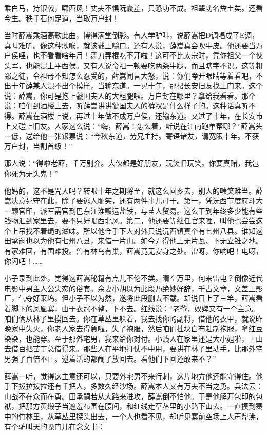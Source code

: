 乘白马，持银戟，啸西风！丈夫不惧阮囊羞，只恐功不成。祖辈功名粪土矣。还看今生。秩千石何足道，当取万户封！ 

当时薛嵩乘酒高歌此曲，博得满堂倒彩。有人学驴叫，说薛嵩把D调唱成了E调，真叫难听。像这种歌喉，就该戴上嚼口。还有人说，薛嵩真会吹牛皮。他还要当万户侯哩，也不看看啥年月！舞刀弄棍吃不开啦！这可不比太宗时，凭你祖父一个伙头军，也能混上平西侯。又有人说令祖一顿要吃两条牛腿，而且瞎字不识。这等粗鄙之徒，令祖母不知怎么忍受的，薛嵩闻言大怒，说：你们睁开眼睛等着看吧，不出十年薛某人混不出个模样，当输东道。一晃十年，那帮长安旧友找上门来。这个说：薛嵩，你可是抱上虢国夫人的大粗腿啦。万户封在哪里？拿给我看看。那个说：咱们到酒楼上去，听薛嵩讲讲虢国夫人的裤衩是什么样子的。这种话真听不得。薛嵩在酒楼上说，再过十年做不成万户侯，还输东道。又过了十年，在长安市上又碰上旧友。人家这么说：“嗨，薛嵩！怎么着，听说在江南跑单帮哪？”薛嵩头一低，送给他一张银票说：“今秋东道，劳兄主持。寄语诸友，请宽限十年。不获万户封，当割首级！” 

那人说：“得啦老薛，千万别介。大伙都是好朋友，玩笑旧玩笑。你要真赌，我包你死为无头鬼！” 

他妈的，这不是咒人吗？转眼十年之期将至，就这么回乡去，别人的嗤笑难当。薛嵩决意死守在此，除了要逃人耻笑，还有两件事儿可干。第一，凭沅西节度府斗大一颗官印，派军需官到巴东江淮贩运盐铁，与苗人贸易。这么干到年终多少能有些钱物汇到家里去，要不只好喝西北风。第二，他还要等继任官来哩，叫他也尝尝这个上吊找不着绳的滋味。所以他今手下人对外只说沅西镇真个有七州八县。谁知这田承嗣也以为他有七州八县，来借一片山。如今弄得他上无片瓦、下无立锥之地。有家难回，有国难投。兽有林乌有巢，薛嵩竟无安身之处。雷呀，你响吧！电呀，你闪吧！…… 

小子录到此处，觉得这薛嵩秘籍有点儿不伦不类。晴空万里，何来雷电？倒像近代电影中男主人公失恋的俗套。余妻小胡以为此段乃绝妙好辞，千古文章，文盖上影厂，气夺好莱坞。但小子不以为然，遂将此段删去不载。却说日上了三竿，薛嵩看着脚下的凤凰寨，由于衣冠不整，下不去。红线说：“老爷，奴婢又有一个主意。咱们俩从林子里摸回去。你在草丛里躲着，我去找你的副将，借他的衣甲，就说昨晚家中失火，你老人家去得急啦，失了袍服，然后咱们扯块白布赶制袍服，拿红豆染染，也能穿。至于那外宅男，我来给你对付。小贱人在家里还是大小姐啦，上山去借百把苗丁总借得来。那些人在平地打仗不中用，要讲在林子里动手，比那外宅男强了百倍不止。逮着活的都阉了放回去。看他们下回还敢来不？” 

薛嵩一听，觉得这主意还可以，只要外宅男不来行刺，这片地方他还能守得住。他手下拨拉拨拉还有千把人，多数久经沙场。薛嵩本人又有万夫不当之勇。兵法云：山战不在众而在勇。田承嗣若从大路来进攻，薛嵩倒不怕他。于是他解开包印的包袱，把那方黄缎子当遮羞布围在腰间，和红线走草丛里的小路下山去。一直摸到寨中的竹林里，从草丛里探头出去，一个人也看不见，却听见寨前空场上人声鼎沸，有个驴叫天的嗓门儿在念文书： 

